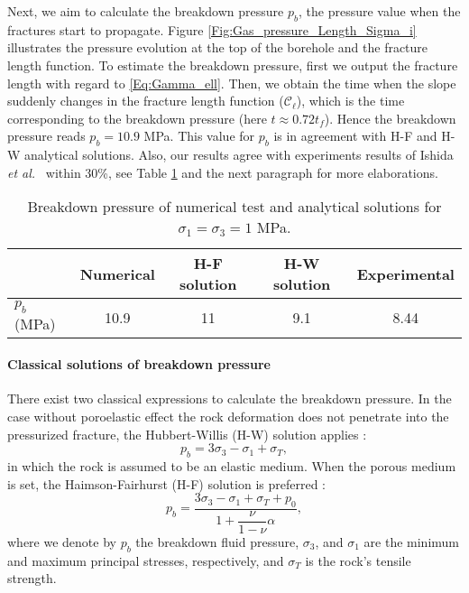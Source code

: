Next, we aim to calculate the breakdown pressure $p_b$, the pressure value when %
the fractures start to propagate.
Figure \ref{Fig:Gas_pressure_Length_Sigma_i} illustrates the pressure evolution at the top of the borehole and the fracture length function. To estimate the breakdown pressure, first we output the fracture length with regard to \eqref{Eq:Gamma_ell}.  Then, we obtain the time when the slope suddenly changes in the fracture length function ($\mathcal{C}_{\ell}$), which is the time corresponding to the breakdown pressure (here $t\approx 0.72t_f$). Hence the breakdown pressure reads $p_b =10.9$ MPa. This value for $p_b$ is in agreement with H-F and H-W analytical solutions. Also, our results agree  with experiments results of Ishida \emph{et al.}~\cite{ishida2012acoustic} within 30\%, see Table \ref{Tab:preakdown_ISO_insitustress} and the next paragraph for more elaborations. 
\begin{table}[htbp]
	\centering
	\caption{Breakdown pressure of numerical test and analytical solutions for $\sigma_1=\sigma_3=1$ MPa.}
	\begin{tabular}{l c c c c}
		\hline 
		& Numerical & H-F solution & H-W solution & Experimental \cite{ishida2012acoustic}  \\
		\hline 
		$p_b$ (MPa) & 10.9 & 11 &  9.1 & 8.44\\
		\hline      
	\end{tabular}
	\label{Tab:preakdown_ISO_insitustress}
\end{table}

\paragraph{Classical solutions of breakdown pressure} There exist two classical expressions to calculate the breakdown pressure. In the case without poroelastic effect the rock deformation does not penetrate into the pressurized fracture, the Hubbert-Willis (H-W) solution applies \cite{hubbert1972mechanics}:
\begin{equation*}
    p_b =3 \sigma_{3}- \sigma_{1}+\sigma_T,
\end{equation*}
in which the rock is assumed to be an elastic medium. When the porous medium is set, the Haimson-Fairhurst (H-F) solution is preferred \cite{haimson1967initiation}:
\begin{equation*}
    p_b=\dfrac{3\sigma_{3}- \sigma_{1}+\sigma_T+p_0}{1+\dfrac{\nu}{1-\nu}\alpha},
\end{equation*}
where we denote by $p_b$ the breakdown fluid pressure, $\sigma_{3}$, and $\sigma_{1}$ are the minimum and maximum principal stresses, respectively, and $\sigma_T$ is the rock's tensile strength.

